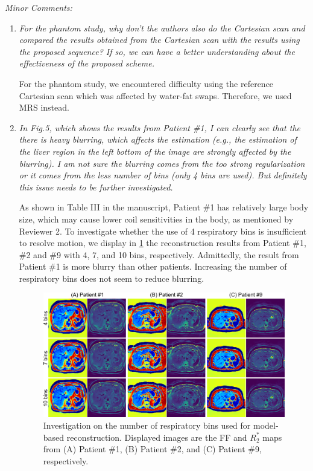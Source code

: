 \documentclass[a4paper,11pt]{report}
\begin{document}
\noindent \textit{Minor Comments:}

\begin{enumerate}[resume]

	\item \textit{For the phantom study, why don't the authors also do the Cartesian scan and compared the results obtained from the Cartesian scan with the results using the proposed sequence? If so, we can have a better understanding about the effectiveness of the proposed scheme.}

\hspace{1em} For the phantom study, we encountered difficulty using the reference Cartesian scan which
was affected by water-fat swaps. Therefore, we used MRS instead.

	\item \textit{In Fig.5, which shows the results from Patient \#1, I can clearly see that the there is heavy blurring, which affects the estimation (e.g., the estimation of the liver region in the left bottom of the image are strongly affected by the blurring). I am not sure the blurring comes from the too strong regularization or it comes from the less number of bins (only 4 bins are used). But definitely this issue needs to be further investigated.}

\hspace{1em} As shown in Table III in the manuscript, Patient \#1 has relatively large body size, 
which may cause lower coil sensitivities in the body, as mentioned by Reviewer 2. 
To investigate whether the use of 4 respiratory bins is insufficient 
to resolve motion, we display in \cref{SUPPFIG:BINS} the reconstruction results 
from Patient \#1, \#2 and \#9 with 4, 7, and 10 bins, respectively.
Admittedly, the result from Patient \#1 is more blurry than other patients. 
Increasing the number of respiratory bins does not seem to reduce blurring. 


\begin{figure}[t]
	\centering
	\includegraphics[width=\textwidth]{../../figures/supp_tan4.png}
	\caption{Investigation on the number of respiratory bins used for model-based reconstruction.
	Displayed images are the FF and $R_2^*$ maps from (A) Patient \#1, (B) Patient \#2, and (C) Patient \#9, respectively.}
	\label{SUPPFIG:BINS}
\end{figure}


\end{enumerate}
\end{document}
